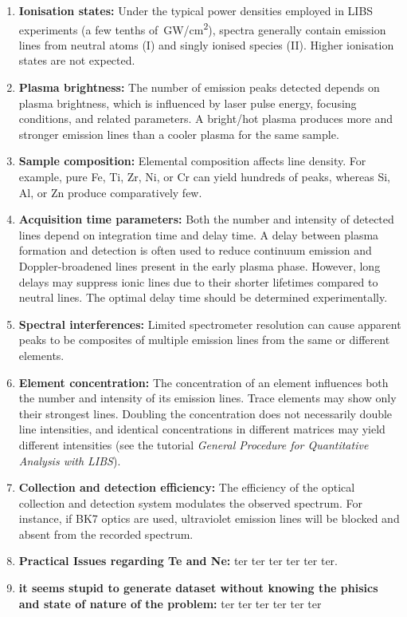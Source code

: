 \documentclass[12pt,a4paper]{article}
\begin{document}
	\begin{enumerate}[label=\textbullet]
		\item \textbf{Ionisation states:}  
		Under the typical power densities employed in LIBS experiments (a few tenths of~GW/cm\textsuperscript{2}), spectra generally contain emission lines from neutral atoms (I) and singly ionised species (II). Higher ionisation states are not expected.
		
		\item \textbf{Plasma brightness:}  
		The number of emission peaks detected depends on plasma brightness, which is influenced by laser pulse energy, focusing conditions, and related parameters. A bright/hot plasma produces more and stronger emission lines than a cooler plasma for the same sample.
		
		\item \textbf{Sample composition:}  
		Elemental composition affects line density. For example, pure Fe, Ti, Zr, Ni, or Cr can yield hundreds of peaks, whereas Si, Al, or Zn produce comparatively few.
		
		\item \textbf{Acquisition time parameters:}  
		Both the number and intensity of detected lines depend on integration time and delay time. A delay between plasma formation and detection is often used to reduce continuum emission and Doppler-broadened lines present in the early plasma phase. However, long delays may suppress ionic lines due to their shorter lifetimes compared to neutral lines. The optimal delay time should be determined experimentally.
		
		\item \textbf{Spectral interferences:}  
		Limited spectrometer resolution can cause apparent peaks to be composites of multiple emission lines from the same or different elements.
		
		\item \textbf{Element concentration:}  
		The concentration of an element influences both the number and intensity of its emission lines. Trace elements may show only their strongest lines. Doubling the concentration does not necessarily double line intensities, and identical concentrations in different matrices may yield different intensities (see the tutorial \emph{General Procedure for Quantitative Analysis with LIBS}).
		
		\item \textbf{Collection and detection efficiency:}  
		The efficiency of the optical collection and detection system modulates the observed spectrum. For instance, if BK7 optics are used, ultraviolet emission lines will be blocked and absent from the recorded spectrum.
		
		\item \textbf{Practical Issues regarding Te and Ne:}  
		ter ter ter ter ter ter.
		
		\item \textbf{it seems stupid to generate dataset without knowing the phisics and state of nature of the problem:}  
		ter ter ter ter ter ter
		
	\end{enumerate}
	
\end{document}
